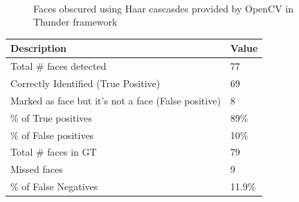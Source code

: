 \documentclass[
	submission,
	final,
	notitlepage,
	narroweqnarray,
	inline,
	twoside,
	]{ieee}
\begin{document}
\begin{figure}[h]
{	}\\
	\caption{Faces obscured using Haar cascasdes provided by OpenCV in Thunder framework}
\end{figure}
\FloatBarrier

\begin{table}[h!]
	\begin{tabular}{|p{6cm} | p{2cm}|}
		\hline
		{\bf Description} & {\bf Value}\\
		\hline
		\hline
		Total \# faces detected & 77\\
		Correctly Identified (True Positive) & 69 \\
		Marked as face but it's not a face (False positive) & 8 \\
		\% of True positives & 89\%\\
		\% of False positives & 10\%\\
		\hline
		Total \# faces in GT & 79\\
		Missed faces & 9\\
		\% of False Negatives & 11.9\%\\
		\hline
	\end{tabular}
\end{table}
\end{document}
